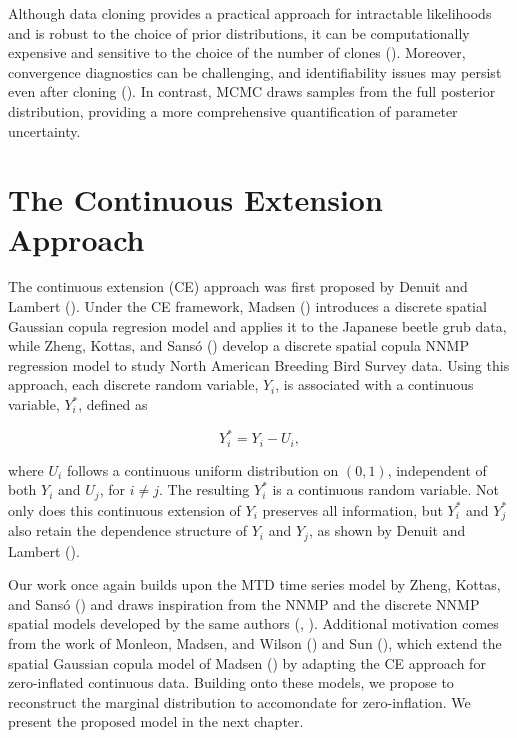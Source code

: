 \documentclass[
  letterpaper,
  double,
  12pt,
  1.0in]{beavtex}
\begin{document}
Although data cloning provides a practical approach for intractable
likelihoods and is robust to the choice of prior distributions, it can
be computationally expensive and sensitive to the choice of the number
of clones (). Moreover, convergence diagnostics can be challenging, and
identifiability issues may persist even after cloning
(). In
contrast, MCMC draws samples from the full posterior distribution,
providing a more comprehensive quantification of parameter uncertainty.

\section{The Continuous Extension
Approach}\label{the-continuous-extension-approach}

The continuous extension (CE) approach was first proposed by Denuit and
Lambert (). Under the CE
framework, Madsen () introduces a
discrete spatial Gaussian copula regresion model and applies it to the
Japanese beetle grub data, while Zheng, Kottas, and Sansó
() develop a discrete spatial
copula NNMP regression model to study North American Breeding Bird
Survey data. Using this approach, each discrete random variable,
\(Y_i\), is associated with a continuous variable, \(Y_i^*\), defined as

\begin{equation}
Y_i^* = Y_i - U_i,
\end{equation}

where \(U_i\) follows a continuous uniform distribution on \((0, 1)\),
independent of both \(Y_i\) and \(U_j\), for \(i \neq j\). The resulting
\(Y_i^*\) is a continuous random variable. Not only does this continuous
extension of \(Y_i\) preserves all information, but \(Y^*_i\) and
\(Y^*_j\) also retain the dependence structure of \(Y_i\) and \(Y_j\),
as shown by Denuit and Lambert
().

Our work once again builds upon the MTD time series model by Zheng,
Kottas, and Sansó () and draws
inspiration from the NNMP and the discrete NNMP spatial models developed
by the same authors (, ). Additional
motivation comes from the work of Monleon, Madsen, and Wilson
() and Sun
(), which extend the spatial
Gaussian copula model of Madsen ()
by adapting the CE approach for zero-inflated continuous data. Building
onto these models, we propose to reconstruct the marginal distribution
to accomondate for zero-inflation. We present the proposed model in the
next chapter.
\end{document}

